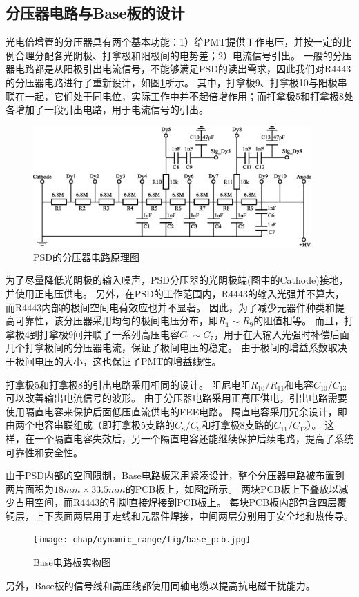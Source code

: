 \subsection{分压器电路与Base板的设计}
\label{sec:dynamic_range:hv_divider}
光电倍增管的分压器具有两个基本功能：1）给PMT提供工作电压，并按一定的比例合理分配各光阴极、打拿极和阳极间的电势差；2）电流信号引出。
一般的分压器电路都是从阳极引出电流信号，不能够满足PSD的读出需求，因此我们对R4443的分压器电路进行了重新设计，如图\ref{fig:dynamic_range:divider}所示。
其中，打拿极9、打拿极10与阳极串联在一起，它们处于同电位，实际工作中并不起倍增作用；而打拿极5和打拿极8处各增加了一段引出电路，用于电流信号的引出。
\begin{figure}[!htbp]
	\centering
	\includegraphics[width=0.95\textwidth]{chap/dynamic_range/fig/divider.eps}
	\caption{PSD的分压器电路原理图}
	\label{fig:dynamic_range:divider}
\end{figure}

为了尽量降低光阴极的输入噪声，PSD分压器的光阴极端(图中的Cathode)接地，并使用正电压供电。
另外，在PSD的工作范围内，R4443的输入光强并不算大，而R4443内部的极间空间电荷效应也并不显著。
因此，为了减少元器件种类和提高可靠性，该分压器采用均匀的极间电压分布，即$R_1 \sim R_9$的阻值相等。
而且，打拿极4到打拿极9间并联了一系列高压电容$C_1 \sim C_7$，用于在大输入光强时补偿后面几个打拿极间的分压器电流，保证了极间电压的稳定。
由于极间的增益系数取决于极间电压的大小，这也保证了PMT的增益线性。

打拿极5和打拿极8的引出电路采用相同的设计。
阻尼电阻$R_{10}/R_{11}$和电容$C_{10}/C_{13}$可以改善输出电流信号的波形。
由于分压器电路采用正高压供电，引出电路需要使用隔直电容来保护后面低压直流供电的FEE电路。
隔直电容采用冗余设计，即由两个电容串联组成（即打拿极5支路的$C_8/C_9$和打拿极8支路的$C_{11}/C_{12}$）。
这样，在一个隔直电容失效后，另一个隔直电容还能继续保护后续电路，提高了系统可靠性和安全性。

由于PSD内部的空间限制，Base电路板采用紧凑设计，整个分压器电路被布置到两片面积为$18mm\times 33.5mm$的PCB板上，如图\ref{fig:dynamic_range:base_pcb}所示。
两块PCB板上下叠放以减少占用空间，而R4443的引脚直接焊接到PCB板上。
每块PCB板内部包含四层覆铜层，上下表面两层用于走线和元器件焊接，中间两层分别用于安全地和热传导。
\begin{figure}[htbp]
	\centering
	\texttt{[image: chap/dynamic\_range/fig/base\_pcb.jpg]}
	\caption{Base电路板实物图}
	\label{fig:dynamic_range:base_pcb}
\end{figure}
另外，Base板的信号线和高压线都使用同轴电缆以提高抗电磁干扰能力。

